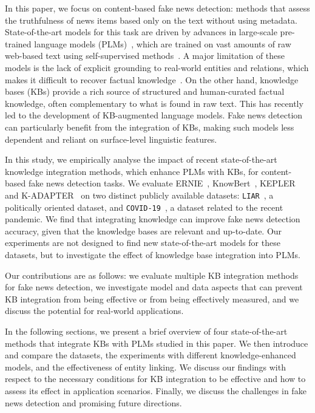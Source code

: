 \documentclass[letterpaper]{article} %
\begin{document}
In this paper, we focus on content-based fake news detection: methods that assess the truthfulness of news items based only on the text without using metadata.
State-of-the-art models for this task are driven by advances in
large-scale pre-trained language models (PLMs)~\citep[e.g.][]{Liu2019ATM, Kaliyar2021FakeBERT}, which are trained on vast amounts of raw web-based text using self-supervised methods~\cite{rogers-etal-2020-primer}.
A major limitation of these models is the lack of explicit grounding to real-world entities and relations, which makes it difficult to recover factual knowledge~\cite{Bender2021OnTD}.
On the other hand, knowledge bases (KBs) provide a rich source of structured and human-curated factual knowledge, often complementary to what is found in raw text.
This has recently led to the development of KB-augmented language models.
Fake news detection can particularly benefit from the integration of KBs, making such models less dependent and reliant on surface-level linguistic features.

In this study, we empirically analyse the impact of recent state-of-the-art knowledge integration methods, which enhance PLMs with KBs, for content-based fake news detection tasks.
We evaluate ERNIE~\cite{zhang-etal-2019-ernie},  KnowBert~\cite{peters-etal-2019-knowledge}, KEPLER~\cite{kepler} and K-ADAPTER~\cite{wang-etal-2021-k} on two distinct publicly available datasets:  \texttt{LIAR}~\cite{wang-2017-liar}, a politically oriented dataset, and \texttt{COVID-19}~\cite{Patwa2021FightingAI}, a dataset related to the recent pandemic.
We find that integrating knowledge can improve fake news detection accuracy, given that the knowledge bases are relevant and up-to-date.
Our experiments are not designed to find new state-of-the-art models for these datasets, but to investigate the effect of knowledge base integration into PLMs.

Our contributions are as follows: we evaluate multiple KB integration methods for fake news detection, we investigate model and data  aspects that can prevent KB integration from being effective or from being effectively measured, and we discuss the potential for real-world applications.

In the following sections, we present a brief overview of four state-of-the-art methods that integrate KBs with PLMs studied in this paper.
We then introduce and compare the datasets, the experiments with different knowledge-enhanced models, and the effectiveness of entity linking.
We discuss our findings with respect to the necessary conditions for KB integration to be effective and how to assess its effect in application scenarios.
Finally, we discuss the challenges in fake news detection and promising future directions.
\end{document}
